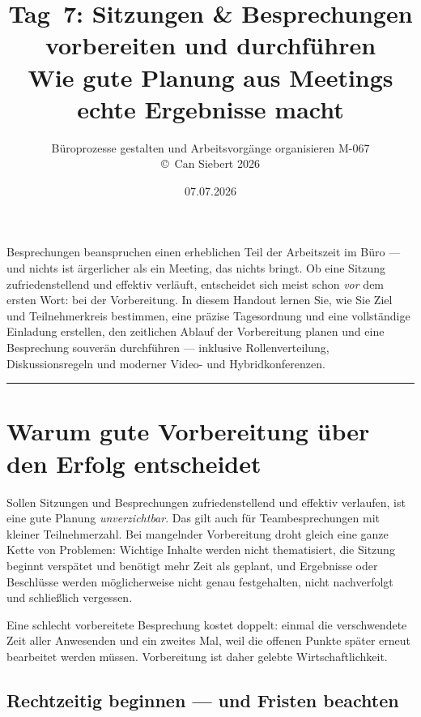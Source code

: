 \documentclass[11pt, a4paper]{article}
\title{\vspace*{-1.5cm}\Huge\bfseries\color{bfwPrimaryDark}Tag~7: Sitzungen \& Besprechungen vorbereiten und durchführen\\[0.4em]
  \large\color{bfwInkSoft}\textnormal{Wie gute Planung aus Meetings echte Ergebnisse macht}}
\author{\textsf{Büroprozesse gestalten und Arbeitsvorgänge organisieren \textperiodcentered{} M-067}\\
\textsf{\small\copyright\ Can Siebert\,\textperiodcentered\,2026}}
\date{07.07.2026}
\begin{document}
\maketitle
\thispagestyle{empty}

\vspace{1em}
\begin{merksatz}[title={\bfseries Worum geht es heute?}]
Besprechungen beanspruchen einen erheblichen Teil der Arbeitszeit im Büro --- und nichts
ist ärgerlicher als ein Meeting, das nichts bringt. Ob eine Sitzung zufriedenstellend und
effektiv verläuft, entscheidet sich meist schon \emph{vor} dem ersten Wort: bei der
Vorbereitung. In diesem Handout lernen Sie, wie Sie Ziel und Teilnehmerkreis bestimmen,
eine präzise Tagesordnung und eine vollständige Einladung erstellen, den zeitlichen Ablauf
der Vorbereitung planen und eine Besprechung souverän durchführen --- inklusive
Rollenverteilung, Diskussionsregeln und moderner Video- und Hybridkonferenzen.
\end{merksatz}

\tableofcontents
\vspace{1em}
\hrule
\vspace{1em}

\section{Warum gute Vorbereitung über den Erfolg entscheidet}

Sollen Sitzungen und Besprechungen zufriedenstellend und effektiv verlaufen, ist eine gute
Planung \emph{unverzichtbar}. Das gilt auch für Teambesprechungen mit kleiner
Teilnehmerzahl. Bei mangelnder Vorbereitung droht gleich eine ganze Kette von Problemen:
Wichtige Inhalte werden nicht thematisiert, die Sitzung beginnt verspätet und benötigt mehr
Zeit als geplant, und Ergebnisse oder Beschlüsse werden möglicherweise nicht genau
festgehalten, nicht nachverfolgt und schließlich vergessen.

\begin{merksatz}
Eine schlecht vorbereitete Besprechung kostet doppelt: einmal die verschwendete Zeit aller
Anwesenden und ein zweites Mal, weil die offenen Punkte später erneut bearbeitet werden
müssen. Vorbereitung ist daher gelebte Wirtschaftlichkeit.
\end{merksatz}

\subsection{Rechtzeitig beginnen --- und Fristen beachten}
\end{document}
